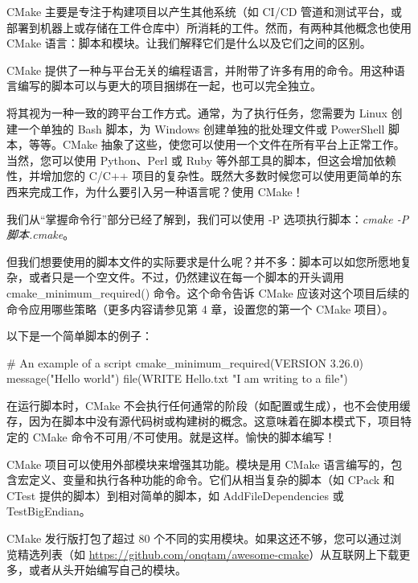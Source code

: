 CMake 主要是专注于构建项目以产生其他系统（如 CI/CD 管道和测试平台，或部署到机器上或存储在工件仓库中）所消耗的工件。然而，有两种其他概念也使用 CMake 语言：脚本和模块。让我们解释它们是什么以及它们之间的区别。



CMake 提供了一种与平台无关的编程语言，并附带了许多有用的命令。用这种语言编写的脚本可以与更大的项目捆绑在一起，也可以完全独立。

将其视为一种一致的跨平台工作方式。通常，为了执行任务，您需要为 Linux 创建一个单独的 Bash 脚本，为 Windows 创建单独的批处理文件或 PowerShell 脚本，等等。CMake 抽象了这些，使您可以使用一个文件在所有平台上正常工作。当然，您可以使用 Python、Perl 或 Ruby 等外部工具的脚本，但这会增加依赖性，并增加您的 C/C++ 项目的复杂性。既然大多数时候您可以使用更简单的东西来完成工作，为什么要引入另一种语言呢？使用 CMake！

我们从“掌握命令行”部分已经了解到，我们可以使用 -P 选项执行脚本：\textit{cmake -P 脚本.cmake}。

但我们想要使用的脚本文件的实际要求是什么呢？并不多：脚本可以如您所愿地复杂，或者只是一个空文件。不过，仍然建议在每一个脚本的开头调用 cmake\_minimum\_required() 命令。这个命令告诉 CMake 应该对这个项目后续的命令应用哪些策略（更多内容请参见第 4 章，设置您的第一个 CMake 项目）。

以下是一个简单脚本的例子：


\begin{cmake}
# An example of a script
cmake_minimum_required(VERSION 3.26.0)
message("Hello world")
file(WRITE Hello.txt "I am writing to a file")
\end{cmake}

在运行脚本时，CMake 不会执行任何通常的阶段（如配置或生成），也不会使用缓存，因为在脚本中没有源代码树或构建树的概念。这意味着在脚本模式下，项目特定的 CMake 命令不可用/不可使用。就是这样。愉快的脚本编写！


CMake 项目可以使用外部模块来增强其功能。模块是用 CMake 语言编写的，包含宏定义、变量和执行各种功能的命令。它们从相当复杂的脚本（如 CPack 和 CTest 提供的脚本）到相对简单的脚本，如 AddFileDependencies 或 TestBigEndian。

CMake 发行版打包了超过 80 个不同的实用模块。如果这还不够，您可以通过浏览精选列表（如 \url{https://github.com/onqtam/awesome-cmake}）从互联网上下载更多，或者从头开始编写自己的模块。

